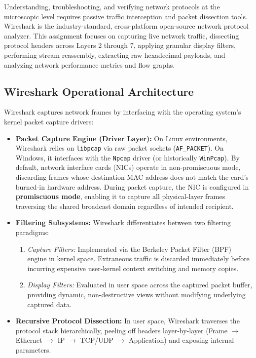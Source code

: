 \documentclass[12pt, a4paper]{article}
\begin{document}
Understanding, troubleshooting, and verifying network protocols at the microscopic level requires passive traffic interception and packet dissection tools. Wireshark is the industry-standard, cross-platform open-source network protocol analyzer. This assignment focuses on capturing live network traffic, dissecting protocol headers across Layers 2 through 7, applying granular display filters, performing stream reassembly, extracting raw hexadecimal payloads, and analyzing network performance metrics and flow graphs.

\subsection{Wireshark Operational Architecture}
Wireshark captures network frames by interfacing with the operating system's kernel packet capture drivers:
\begin{itemize}
    \item \textbf{Packet Capture Engine (Driver Layer):} On Linux environments, Wireshark relies on \texttt{libpcap} via raw packet sockets (\texttt{AF\_PACKET}). On Windows, it interfaces with the \texttt{Npcap} driver (or historically \texttt{WinPcap}). By default, network interface cards (NICs) operate in non-promiscuous mode, discarding frames whose destination MAC address does not match the card's burned-in hardware address. During packet capture, the NIC is configured in \textbf{promiscuous mode}, enabling it to capture all physical-layer frames traversing the shared broadcast domain regardless of intended recipient.
    \item \textbf{Filtering Subsystems:} Wireshark differentiates between two filtering paradigms:
    \begin{enumerate}
        \item \textit{Capture Filters:} Implemented via the Berkeley Packet Filter (BPF) engine in kernel space. Extraneous traffic is discarded immediately before incurring expensive user-kernel context switching and memory copies.
        \item \textit{Display Filters:} Evaluated in user space across the captured packet buffer, providing dynamic, non-destructive views without modifying underlying captured data.
    \end{enumerate}
    \item \textbf{Recursive Protocol Dissection:} In user space, Wireshark traverses the protocol stack hierarchically, peeling off headers layer-by-layer (Frame $\rightarrow$ Ethernet $\rightarrow$ IP $\rightarrow$ TCP/UDP $\rightarrow$ Application) and exposing internal parameters.
\end{itemize}
\end{document}
